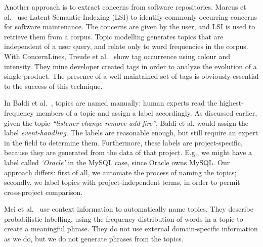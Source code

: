 \documentclass[smallextended]{svjour3}       %
\begin{document}
Another approach is to extract concerns from software repositories.
Marcus et al.~\cite{marcus04wcre} use Latent Semantic Indexing (LSI)
to identify commonly occurring concerns for software maintenance. 
The
concerns are given by the user, and LSI is used to retrieve them from
a corpus. 
Topic modelling generates topics that are independent of a user query, and relate only to word frequencies in the corpus.
With ConcernLines, Treude et al.~\cite{treude09cl} show tag occurrence
using colour and intensity. 
They mine
developer created tags 
in order to analyze the evolution of a single product.
The presence of a well-maintained set of tags is obviously essential to the success of this technique.


In Baldi et al.~\cite{Baldi2008}, topics are named manually: human
experts read the highest-frequency members of a topic and assign a
label accordingly. 
As discussed earlier, given the topic \emph{``listener change remove add fire''}, Baldi et al. would assign the label \emph{event-handling}. 
The labels are reasonable enough, but still require an expert in the field to determine them. 
Furthermore, these labels are project-specific, because they are generated from the data of that project. E.g., we might have a label called \emph{`Oracle'} in the MySQL case, since Oracle owns MySQL. 
Our approach differs: first of all, we automate the process of naming the topics; secondly, we label topics with project-independent terms, in order to permit cross-project comparison.

Mei et al.~\cite{Mei2007} use context information to automatically name topics. 
They describe probabilistic labelling, using the frequency distribution of words in a topic to create a meaningful phrase. 
They do not use external domain-specific information as we do, but we
do not generate phrases from the topics.
\end{document}
